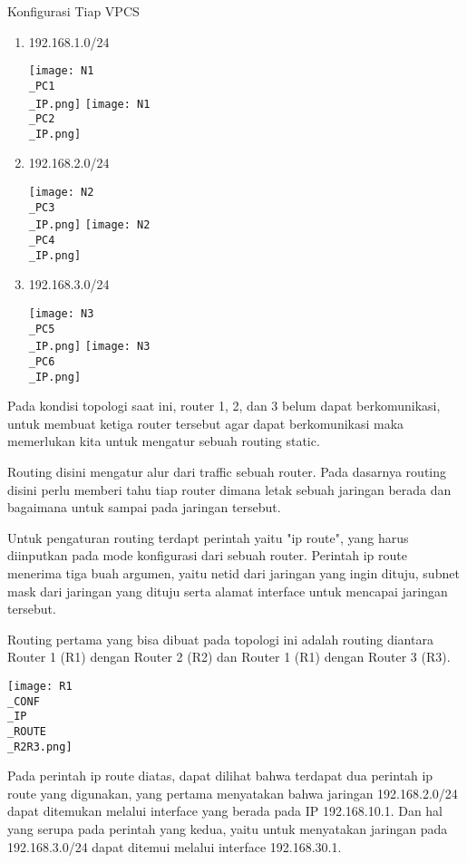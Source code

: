 \documentclass[12pt, a4paper]{article}
\begin{document}
  Konfigurasi Tiap VPCS

  \begin{enumerate}
    \item 192.168.1.0/24
      \begin{center}
        \texttt{[image: N1\\\_PC1\\\_IP.png]}
        \texttt{[image: N1\\\_PC2\\\_IP.png]}
      \end{center}

    \item 192.168.2.0/24
      \begin{center}
        \texttt{[image: N2\\\_PC3\\\_IP.png]}
        \texttt{[image: N2\\\_PC4\\\_IP.png]}
      \end{center}

    \item 192.168.3.0/24
      \begin{center}
        \texttt{[image: N3\\\_PC5\\\_IP.png]}
        \texttt{[image: N3\\\_PC6\\\_IP.png]}
      \end{center}
  \end{enumerate}

  Pada kondisi topologi saat ini, router 1, 2, dan 3 belum dapat
  berkomunikasi, untuk membuat ketiga router tersebut agar dapat berkomunikasi
  maka memerlukan kita untuk mengatur sebuah routing static.

  Routing disini mengatur alur dari traffic sebuah router. Pada dasarnya routing
  disini perlu memberi tahu tiap router dimana letak sebuah jaringan berada dan
  bagaimana untuk sampai pada jaringan tersebut.

  Untuk pengaturan routing terdapt perintah yaitu "ip route", yang harus diinputkan
  pada mode konfigurasi dari sebuah router. Perintah ip route menerima
  tiga buah argumen, yaitu netid dari jaringan yang ingin dituju, subnet
  mask dari jaringan yang dituju serta alamat interface untuk mencapai jaringan
  tersebut.

  Routing pertama yang bisa dibuat pada topologi ini adalah routing diantara
  Router 1 (R1) dengan Router 2 (R2) dan Router 1 (R1) dengan Router 3 (R3).

  \begin{center}
    \texttt{[image: R1\\\_CONF\\\_IP\\\_ROUTE\\\_R2R3.png]}
  \end{center}

  Pada perintah ip route diatas, dapat dilihat bahwa terdapat dua perintah
  ip route yang digunakan, yang pertama menyatakan bahwa jaringan
  192.168.2.0/24 dapat ditemukan melalui interface yang berada pada IP
  192.168.10.1. Dan hal yang serupa pada perintah yang kedua, yaitu
  untuk menyatakan jaringan pada 192.168.3.0/24 dapat ditemui melalui
  interface 192.168.30.1.
\end{document}
